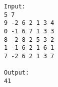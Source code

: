 \begin{verbatim}
Input:
5 7
9 -2 6 2 1 3 4
0 -1 6 7 1 3 3
8 -2 8 2 5 3 2
1 -1 6 2 1 6 1
7 -2 6 2 1 3 7

Output:
41
\end{verbatim}